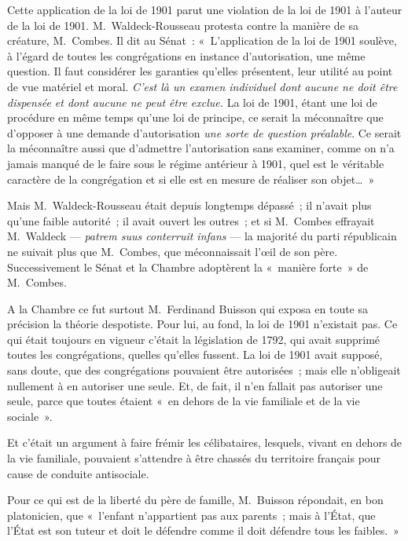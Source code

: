 \documentclass[french,twoside]{book} %
\begin{document}
Cette application de la loi de 1901 parut une violation de la loi de 1901 à l’auteur de la loi de 1901. M. Waldeck-Rousseau protesta contre la manière de sa créature, M. Combes. Il dit au Sénat : « L’application de la loi de 1901 soulève, à l’égard de toutes les congrégations en instance d’autorisation, une même question. Il faut considérer les garanties qu’elles présentent, leur utilité au point de vue matériel et moral. {\itshape C’est là un examen individuel dont aucune ne doit être dispensée et dont aucune ne peut être exclue.} La loi de 1901, étant une loi de procédure en même temps qu’une loi de principe, ce serait la méconnaître que d’opposer à une demande d’autorisation {\itshape une sorte de question préalable}. Ce serait la méconnaître aussi que d’admettre l’autorisation sans examiner, comme on n’a jamais manqué de le faire sous le régime antérieur à 1901, quel est le véritable caractère de la congrégation et si elle est en mesure de réaliser son objet… »\par
Mais M. Waldeck-Rousseau était depuis longtemps dépassé ; il n’avait plus qu’une faible autorité ; il avait ouvert les outres ; et si M. Combes  effrayait M. Waldeck — {\itshape patrem suus conterruit infans} — la majorité du parti républicain ne suivait plus que M. Combes, que méconnaissait l’œil de son père. Successivement le Sénat et la Chambre adoptèrent la « manière forte » de M. Combes.\par
A la Chambre ce fut surtout M. Ferdinand Buisson qui exposa en toute sa précision la théorie despotiste. Pour lui, au fond, la loi de 1901 n’existait pas. Ce qui était toujours en vigueur c’était la législation de 1792, qui avait supprimé toutes les congrégations, quelles qu’elles fussent. La loi de 1901 avait supposé, sans doute, que des congrégations pouvaient être autorisées ; mais elle n’obligeait nullement à en autoriser une seule. Et, de fait, il n’en fallait pas autoriser une seule, parce que toutes étaient « en dehors de la vie familiale et de la vie sociale ».\par
Et c’était un argument à faire frémir les célibataires, lesquels, vivant en dehors de la vie familiale, pouvaient s’attendre à être chassés du territoire français pour cause de conduite antisociale.\par
Pour ce qui est de la liberté du père de famille, M. Buisson répondait, en bon platonicien, que « l’enfant n’appartient pas aux parents ; mais à l’État, que l’État est son tuteur et doit le défendre comme il doit défendre tous les faibles. »\par
\end{document}
